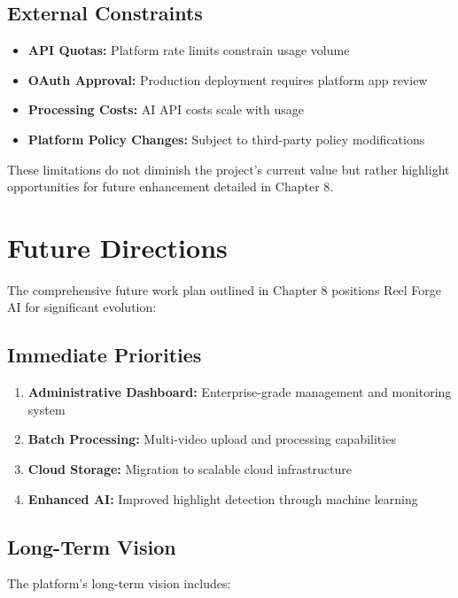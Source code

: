\subsection{External Constraints}

\begin{itemize}
    \item \textbf{API Quotas:} Platform rate limits constrain usage volume
    \item \textbf{OAuth Approval:} Production deployment requires platform app review
    \item \textbf{Processing Costs:} AI API costs scale with usage
    \item \textbf{Platform Policy Changes:} Subject to third-party policy modifications
\end{itemize}

These limitations do not diminish the project's current value but rather highlight opportunities for future enhancement detailed in Chapter 8.

\section{Future Directions}

The comprehensive future work plan outlined in Chapter 8 positions Reel Forge AI for significant evolution:

\subsection{Immediate Priorities}

\begin{enumerate}
    \item \textbf{Administrative Dashboard:} Enterprise-grade management and monitoring system
    \item \textbf{Batch Processing:} Multi-video upload and processing capabilities
    \item \textbf{Cloud Storage:} Migration to scalable cloud infrastructure
    \item \textbf{Enhanced AI:} Improved highlight detection through machine learning
\end{enumerate}

\subsection{Long-Term Vision}

The platform's long-term vision includes:


